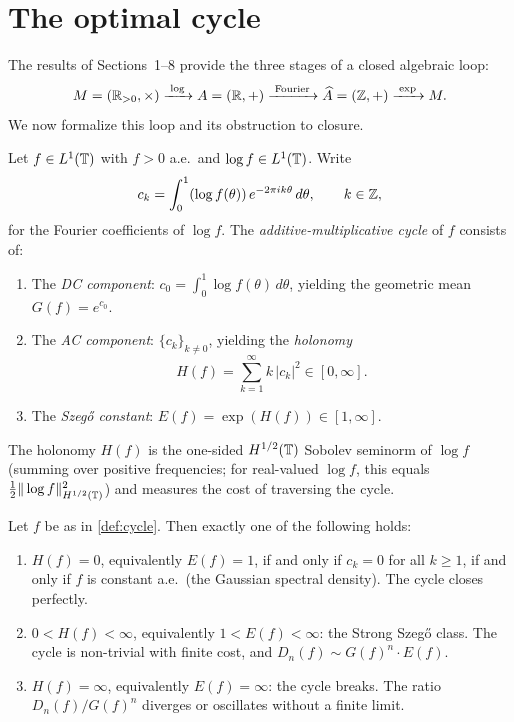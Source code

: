 \section{The optimal cycle}\label{sec:cycle}

The results of Sections~1--8 provide the three stages of a closed algebraic loop:
\[
M = (\mathbb{R}_{>0}, \times)
\xrightarrow{\;\log\;}
A = (\mathbb{R}, +)
\xrightarrow{\;\text{Fourier}\;}
\widehat{A} = (\mathbb{Z}, +)
\xrightarrow{\;\exp\;}
M.
\]
We now formalize this loop and its obstruction to closure.

\begin{definition}\label{def:cycle}
Let $f \in L^1(\mathbb{T})$ with $f > 0$ a.e.\ and $\log f \in L^1(\mathbb{T})$. Write
\[
c_k = \int_0^1 (\log f(\theta))\, e^{-2\pi i k\theta}\, d\theta, \qquad k \in \mathbb{Z},
\]
for the Fourier coefficients of $\log f$. The \emph{additive-multiplicative cycle} of $f$ consists of:
\begin{enumerate}[label=(\roman*)]
\item The \emph{DC component}: $c_0 = \int_0^1 \log f(\theta)\, d\theta$, yielding the geometric mean $G(f) = e^{c_0}$.
\item The \emph{AC component}: $\{c_k\}_{k \neq 0}$, yielding the \emph{holonomy}
\begin{equation}\label{eq:holonomy}
H(f) = \sum_{k=1}^{\infty} k\, |c_k|^2 \in [0, \infty].
\end{equation}
\item The \emph{Szeg\H{o} constant}: $E(f) = \exp(H(f)) \in [1, \infty]$.
\end{enumerate}
The holonomy $H(f)$ is the one-sided $H^{1/2}(\mathbb{T})$ Sobolev seminorm of $\log f$ (summing over positive frequencies; for real-valued $\log f$, this equals $\frac{1}{2}\|\log f\|_{H^{1/2}(\mathbb{T})}^2$) and measures the cost of traversing the cycle.
\end{definition}

\begin{theorem}\label{thm:holonomy-trichotomy}
Let $f$ be as in \cref{def:cycle}. Then exactly one of the following holds:
\begin{enumerate}[label=(\roman*)]
\item $H(f) = 0$, equivalently $E(f) = 1$, if and only if $c_k = 0$ for all $k \geq 1$, if and only if $f$ is constant a.e.\ (the Gaussian spectral density). The cycle closes perfectly.
\item $0 < H(f) < \infty$, equivalently $1 < E(f) < \infty$: the Strong Szeg\H{o} class. The cycle is non-trivial with finite cost, and $D_n(f) \sim G(f)^n \cdot E(f)$.
\item $H(f) = \infty$, equivalently $E(f) = \infty$: the cycle breaks. The ratio $D_n(f) / G(f)^n$ diverges or oscillates without a finite limit.
\end{enumerate}
\end{theorem}

